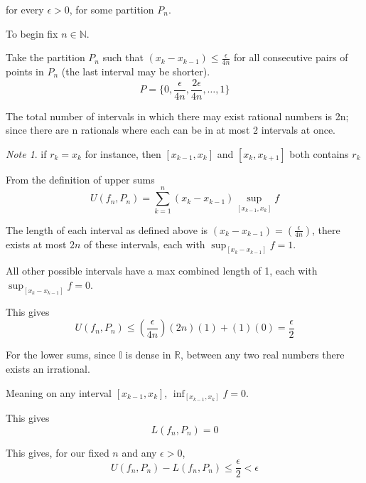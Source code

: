 \documentclass[12pt]{article}
\theoremstyle{plain}
\theoremstyle{definition}
\theoremstyle{definition}
\theoremstyle{remark}
\newtheorem*{remark}{Note}
\begin{document}
for every $\epsilon > 0$, for some partition $P_n$.

To begin fix $n \in \mathbb{N}$.

Take the partition $P_n$ such that $(x_k - x_{k-1}) \leq \frac{\epsilon}{4n}$ for all consecutive
pairs of points in $P_n$ (the last interval may be shorter).
\begin{equation*}
    P = \{0, \frac{\epsilon}{4n}, \frac{2\epsilon}{4n}, \ldots, 1\}
\end{equation*}

The total number of intervals in which there may exist rational numbers is 2n;
since there are n rationals where each can be in at most 2 intervals at once.

\begin{remark}
    if $r_k = x_k$ for instance, then $[x_{k-1}, x_k]$ and $[x_k, x_{k+1}]$ both contains $r_k$
\end{remark}


From the definition of upper sums
\begin{equation*}
    U(f_n, P_n) = \sum_{k=1}^{n} (x_k - x_{k-1}) \sup_{[x_{k-1}, x_k]} f
\end{equation*}

The length of each interval as defined above is $(x_k - x_{k-1}) = (\frac{\epsilon}{4n})$, 
there exists at most $2n$ of these intervals, each with $\sup_{[x_k - x_{k-1}]} f = 1$. 

All other possible intervals have a max combined length of 1,
each with $\sup_{[x_k - x_{k-1}]} f = 0$.

This gives
\begin{equation*}
    U(f_n, P_n) \leq (\frac{\epsilon}{4n})(2n)(1) + (1)(0) = \frac{\epsilon}{2}
\end{equation*}

For the lower sums, since $\mathbb{I}$ is dense in $\mathbb{R}$, 
between any two real numbers there exists an irrational.

Meaning on any interval $[x_{k-1}, x_k]$, $\inf_{[x_{k-1}, x_k]} f = 0$.

This gives
\begin{equation*}
    L(f_n, P_n) = 0
\end{equation*}

This gives, for our fixed $n$ and any $\epsilon > 0$,
\begin{equation*}
    U(f_n, P_n) - L(f_n, P_n) \leq \frac{\epsilon}{2} < \epsilon
\end{equation*}
\end{document}
